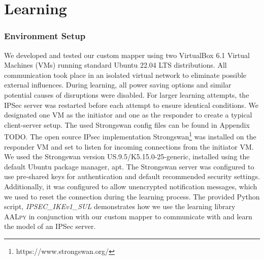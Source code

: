 %
%
% 
% 
% 

\chapter{Learning}

\label{chap:Learning}

\subsection{Environment Setup} \label{sec:Environment}
We developed and tested our custom mapper using two VirtualBox 6.1 Virtual Machines (VMs) running standard Ubuntu 22.04 LTS distributions. All communication took place in an isolated virtual network to eliminate possible external influences. During learning, all power saving options and similar potential causes of disruptions were disabled. For larger learning attempts, the IPSec server was restarted before each attempt to ensure identical conditions. We designated one VM as the initiator and one as the responder to create a typical client-server setup. The used Strongswan config files can be found in Appendix TODO. The open source IPsec implementation Strongswan\footnote{https://www.strongswan.org/} was installed on the responder VM and set to listen for incoming connections from the initiator VM. We used the Strongswan version US.9.5/K5.15.0-25-generic, installed using the default Ubuntu package manager, apt. The Strongswan server was configured to use pre-shared keys for authentication and default recommended security settings. Additionally, it was configured to allow unencrypted notification messages, which we used to reset the connection during the learning process. The provided Python script, \emph{IPSEC\_IKEv1\_SUL} demonstrates how we use the learning library \textsc{AALpy} in conjunction with our custom mapper to communicate with and learn the model of an IPSec server.

